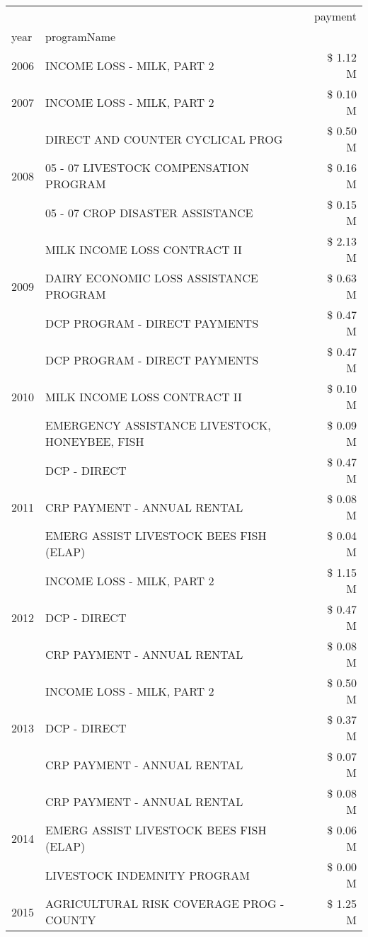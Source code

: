 \begin{tabular}{llr}
\toprule
 &  & payment \\
year & programName &  \\
\midrule
2006 & INCOME LOSS - MILK, PART 2 & \$ 1.12 M \\
\cline{1-3}
2007 & INCOME LOSS - MILK, PART 2 & \$ 0.10 M \\
\cline{1-3}
\multirow[t]{3}{*}{2008} & DIRECT AND COUNTER CYCLICAL PROG & \$ 0.50 M \\
 & 05 - 07 LIVESTOCK COMPENSATION PROGRAM & \$ 0.16 M \\
 & 05 - 07 CROP DISASTER ASSISTANCE & \$ 0.15 M \\
\cline{1-3}
\multirow[t]{3}{*}{2009} & MILK INCOME LOSS CONTRACT II & \$ 2.13 M \\
 & DAIRY ECONOMIC LOSS ASSISTANCE PROGRAM & \$ 0.63 M \\
 & DCP PROGRAM - DIRECT PAYMENTS & \$ 0.47 M \\
\cline{1-3}
\multirow[t]{3}{*}{2010} & DCP PROGRAM - DIRECT PAYMENTS & \$ 0.47 M \\
 & MILK INCOME LOSS CONTRACT II & \$ 0.10 M \\
 & EMERGENCY ASSISTANCE LIVESTOCK, HONEYBEE, FISH & \$ 0.09 M \\
\cline{1-3}
\multirow[t]{3}{*}{2011} & DCP - DIRECT & \$ 0.47 M \\
 & CRP PAYMENT - ANNUAL RENTAL & \$ 0.08 M \\
 & EMERG ASSIST LIVESTOCK BEES FISH (ELAP) & \$ 0.04 M \\
\cline{1-3}
\multirow[t]{3}{*}{2012} & INCOME LOSS - MILK, PART 2 & \$ 1.15 M \\
 & DCP - DIRECT & \$ 0.47 M \\
 & CRP PAYMENT - ANNUAL RENTAL & \$ 0.08 M \\
\cline{1-3}
\multirow[t]{3}{*}{2013} & INCOME LOSS - MILK, PART 2 & \$ 0.50 M \\
 & DCP - DIRECT & \$ 0.37 M \\
 & CRP PAYMENT - ANNUAL RENTAL & \$ 0.07 M \\
\cline{1-3}
\multirow[t]{3}{*}{2014} & CRP PAYMENT - ANNUAL RENTAL & \$ 0.08 M \\
 & EMERG ASSIST LIVESTOCK BEES FISH (ELAP) & \$ 0.06 M \\
 & LIVESTOCK INDEMNITY PROGRAM & \$ 0.00 M \\
\cline{1-3}
\multirow[t]{3}{*}{2015} & AGRICULTURAL RISK COVERAGE PROG - COUNTY & \$ 1.25 M \\

\end{tabular}
